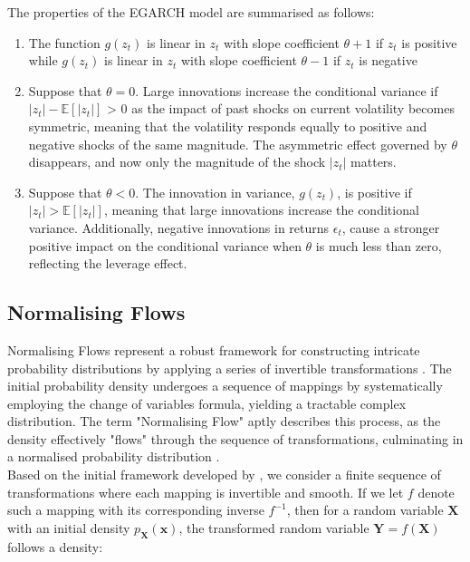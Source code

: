 \documentclass[oneside,12pt]{CUEDthesisPSnPDF}
\newcommand{\E}{\mathbb{E}}
\newcommand{\textcite}{\citet}
\newcommand{\parencite}{\citep}
\begin{document}
The properties of the EGARCH model are summarised as follows:
\begin{enumerate}
    \item The function \(g(z_t)\) is linear in \(z_t\) with slope coefficient \({\theta} + 1\) if \(z_t\) is positive while \(g(z_t)\) is linear in \(z_t\) with slope coefficient \({\theta} - 1\) if \(z_t\) is negative
    \item Suppose that \(\theta = 0\). Large innovations increase the conditional variance if \({| z_{t}|}- \E[| z_{t}|]\) > 0 as the impact of past shocks on current volatility becomes symmetric, meaning that the volatility responds equally to positive and negative shocks of the same magnitude. The asymmetric effect governed by \( \theta \) disappears, and now only the magnitude of the shock \( |z_t| \) matters.
    \item Suppose that \( \theta < 0 \). The innovation in variance, \( g(z_t) \), is positive if \( |z_t| > \mathbb{E}[|z_t|] \), meaning that large innovations increase the conditional variance. Additionally, negative innovations in returns \( \epsilon_t \), cause a stronger positive impact on the conditional variance when \( \theta \) is much less than zero, reflecting the leverage effect.
\end{enumerate}


\subsection{Normalising Flows}
\noindent
Normalising Flows represent a robust framework for constructing intricate probability distributions by applying a series of invertible transformations \parencite{rezende2015variational}. The initial probability density undergoes a sequence of mappings by systematically employing the change of variables formula, yielding a tractable complex distribution. The term "Normalising Flow" aptly describes this process, as the density effectively "flows" through the sequence of transformations, culminating in a normalised probability distribution \parencite{rezende2015variational}.\\

Based on the initial framework developed by \textcite{rezende2015variational}, we consider a finite sequence of transformations where each mapping is invertible and smooth. If we let \( f \) denote such a mapping with its corresponding inverse \( f^{-1} \), then for a random variable \(\mathbf{X}\) with an initial density \( p_\mathbf{X}(\mathbf{x}) \), the transformed random variable \(\mathbf{Y} = f(\mathbf{X})\) follows a density:\\
\end{document}
